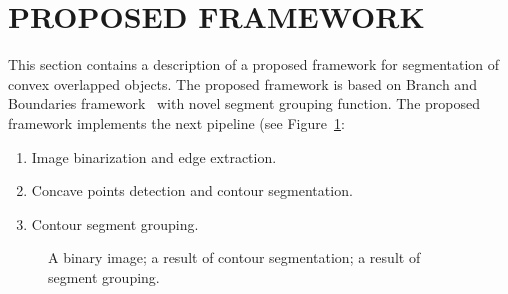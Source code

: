 \documentclass{lutmscthesis}[2010/09/22]
\begin{document}
\section{PROPOSED FRAMEWORK}
\label{sec:proposed}

This section contains a description of a proposed framework for segmentation of convex overlapped objects.
The proposed framework is based on Branch and Boundaries framework~\cite{zafari-bb} with novel segment grouping function. The proposed framework implements the next pipeline (see Figure~\ref{fig:pipeline}:

\begin{enumerate}
    \item Image binarization and edge extraction.
    \item Concave points detection and contour segmentation.
    \item Contour segment grouping.
\end{enumerate}


\begin{figure}[ht]
    \centering
    
    
    \caption[]{
         A binary image;
         a result of contour segmentation;
         a result of segment grouping.
    }
         
    \label{fig:pipeline}
\end{figure}
\end{document}
